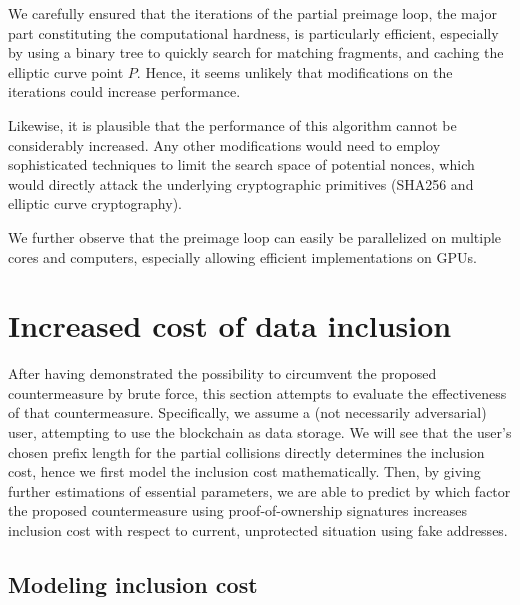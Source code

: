 \documentclass[a4paper,11pt,titlepage]{scrbook}
\begin{document}
We carefully ensured that the iterations of the partial preimage loop, the major part constituting the computational hardness, is particularly efficient, especially by using a binary tree to quickly search for matching fragments, and caching the elliptic curve point $P$.
Hence, it seems unlikely that modifications on the iterations could increase performance.

Likewise, it is plausible that the performance of this algorithm cannot be considerably increased.
Any other modifications would need to employ sophisticated techniques to limit the search space of potential nonces, which would directly attack the underlying cryptographic primitives (SHA256 and elliptic curve cryptography).

We further observe that the preimage loop can easily be parallelized on multiple cores and computers, especially allowing efficient implementations on GPUs.


\chapter{Increased cost of data inclusion}

After having demonstrated the possibility to circumvent the proposed countermeasure by brute force, this section attempts to evaluate the effectiveness of that countermeasure. 
Specifically, we assume a (not necessarily adversarial) user, attempting to use the blockchain as data storage.
We will see that the user's chosen prefix length for the partial collisions directly determines the inclusion cost, hence we first model the inclusion cost mathematically. Then, by giving further estimations of essential parameters, we are able to predict by which factor the proposed countermeasure using proof-of-ownership signatures increases inclusion cost with respect to current, unprotected situation using fake addresses. 

\section{Modeling inclusion cost}
\end{document}
